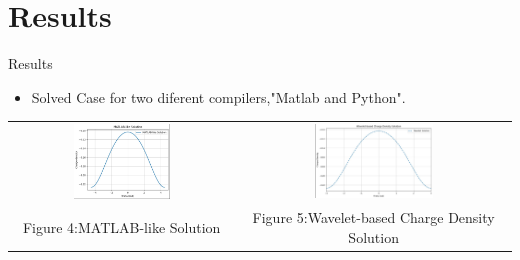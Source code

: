 \documentclass{beamer}
\begin{document}
\section{Results}
\begin{frame}{Results}  
    \begin{itemize}
    \item Solved Case for two diferent compilers,"Matlab and Python".\\[0.5cm]
    \end{itemize}
    \centering
    \begin{tabular}{cc}
        \includegraphics[width=0.45\textwidth]{1.jpg} & 
        \includegraphics[width=0.45\textwidth]{2.jpg} \\
        {\scriptsize {Figure 4:}MATLAB-like Solution} & {\scriptsize {Figure 5:}Wavelet-based Charge Density Solution} \\
        
    \end{tabular}
    
\end{frame}
\end{document}
